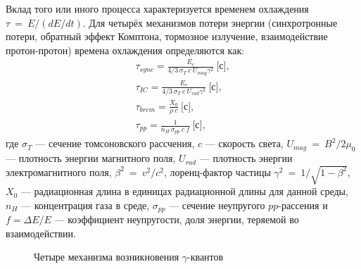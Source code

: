 \documentclass[magd,floatypics,numeref]{msudipl} %
\begin{document}
Вклад того или иного процесса характеризуется временем охлаждения $\tau~=~E/(dE/dt)$. Для четырёх механизмов потери энергии (синхротронные потери, обратный эффект Комптона, тормозное излучение, взаимодействие протон-протон) времена охлаждения определяются как:
\begin{align}
\tau_{sync} = \frac{E_e}{4/3 \,\sigma_T~c~U_{mag} \gamma^2}~\text{[с]}, \\
\tau_{IC} = \frac{E_e}{4/3 \,\sigma_T ~c~U_{rad}   \gamma^2}~\text{[с]}, \\
\tau_{brem} = \frac{X_0}{\rho~c}~\text{[с]}, \\
\tau_{pp} = \frac{1}{n_H \,\sigma_{pp}~c~f}~\text{[с]},
\end{align}
где $\sigma_T$ --- сечение томсоновского рассчения, $c$ --- скорость света,  $U_{mag}~=~B^2/2\mu_0$ --- плотность энергии магнитного поля, $U_{rad}$ --- плотность энергии электромагнитного поля, $\beta^2~=~v^2/c^2$, лоренц-фактор частицы $\gamma^2~=~1/\sqrt{1-\beta^2}$, $X_0$ --- радиационная длина в единицах радиационной длины для данной среды, $n_H$ --- концентрация газа в среде, $\sigma_{pp}$ --- сечение неупругого $pp$-рассения и $f = \Delta E/E$ --- коэффициент неупругости, доля энергии, теряемой во взаимодействии. 

\begin{figure}[th]
	\noindent{}
	\caption{Четыре механизма возникновения $\gamma$-квантов}
	\label{pic:four_mechanisms}
\end{figure}
\end{document}
